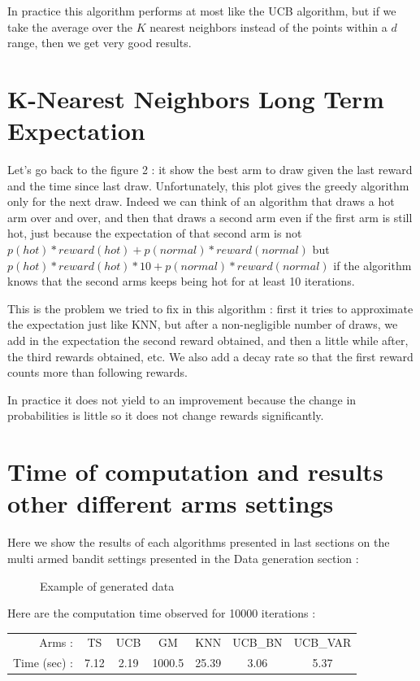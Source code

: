\documentclass{article} %
\begin{document}
In practice this algorithm performs at most like the UCB algorithm, but if we take the average over the $K$ nearest neighbors instead of the points within a $d$ range, then we get very good results.

\section{K-Nearest Neighbors Long Term Expectation}

Let's go back to the figure 2 : it show the best arm to draw given the last reward and the time since last draw. Unfortunately, this plot gives the greedy algorithm only for the next draw. Indeed we can think of an algorithm that draws a hot arm over and over, and then that draws a second arm even if the first arm is still hot, just because the expectation of that second arm is not $p(hot)*reward(hot) + p(normal)*reward(normal)$ but $p(ho	t)*reward(hot)*10 + p(normal)*reward(normal)$ if the algorithm knows that the second arms keeps being hot for at least 10 iterations.

This is the problem we tried to fix in this algorithm : first it tries to approximate the expectation just like KNN, but after a non-negligible number of draws, we add in the expectation the second reward obtained, and then a little while after, the third rewards obtained, etc. We also add a decay rate so that the first reward counts more than following rewards.

In practice it does not yield to an improvement because the change in probabilities is little so it does not change rewards significantly.


\section{Time of computation and results other different arms settings}

Here we show the results of each algorithms presented in last sections on the multi armed bandit settings presented in the Data generation section :

\begin{figure}[h]
	\begin{center}
	\end{center}
	\caption{Example of generated data}
\end{figure}

Here are the computation time observed for 10000 iterations : 
\begin{center}
	\begin{tabular}{rcccccc}
		Arms : & TS & UCB & GM & KNN & UCB\_BN & UCB\_VAR \\
		Time (sec) : & 7.12 & 2.19 & 1000.5 & 25.39 & 3.06 & 5.37
	\end{tabular}
\end{center}
\end{document}
